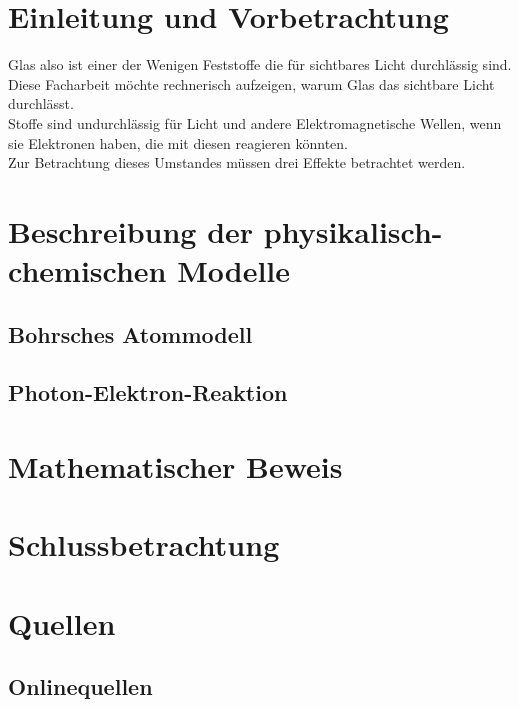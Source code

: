 \documentclass[11pt,a4paper,oneside]{report}
\begin{document}
\renewcommand\contentsname{Inhaltsverzeichnis}
\tableofcontents


\chapter{Einleitung und Vorbetrachtung}

Glas also  ist einer der Wenigen Feststoffe die für sichtbares Licht durchlässig sind. Diese Facharbeit möchte rechnerisch aufzeigen, warum Glas das sichtbare Licht durchlässt.
\\Stoffe sind undurchlässig für Licht und andere Elektromagnetische Wellen, wenn sie Elektronen haben, die mit diesen reagieren könnten.
\\Zur Betrachtung dieses Umstandes müssen drei Effekte betrachtet werden. \cite{pape99}

\chapter{Beschreibung der physikalisch-chemischen Modelle}

\section{Bohrsches Atommodell}

\section{Photon-Elektron-Reaktion}

\chapter{Mathematischer Beweis}

\chapter{Schlussbetrachtung}



\chapter{Quellen}
\section{Onlinequellen}



\end{document}
